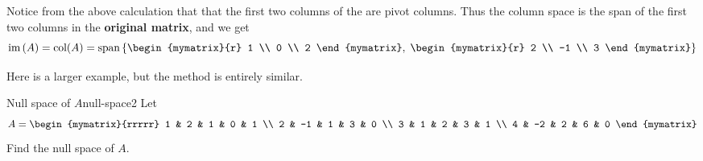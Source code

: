 \begin{solution}
Notice from the above calculation that that the first two columns of the {\rref} are pivot
columns. Thus the  column space is the span of the first two  columns in
the \textbf{original matrix}, and we get 
\begin{equation*}
\func{im}\tup{A} = \func{col}(A) =
\func{span} \set{\begin{mymatrix}{r}
1 \\ 
0 \\ 
2 
\end{mymatrix}, \; \begin{mymatrix}{r}
2 \\ 
-1 \\ 
3 
\end{mymatrix}  }
\end{equation*}

\end{solution}

Here is a larger example, but the method is entirely similar.

\begin{example}{Null space of $A$}{null-space2}
Let
\begin{equation*}
A=\begin{mymatrix}{rrrrr}
1 & 2 & 1 & 0 & 1 \\
2 & -1 & 1 & 3 & 0 \\
3 & 1 & 2 & 3 & 1 \\
4 & -2 & 2 & 6 & 0
\end{mymatrix}
\end{equation*}
Find the null space of $A$.
\end{example}

